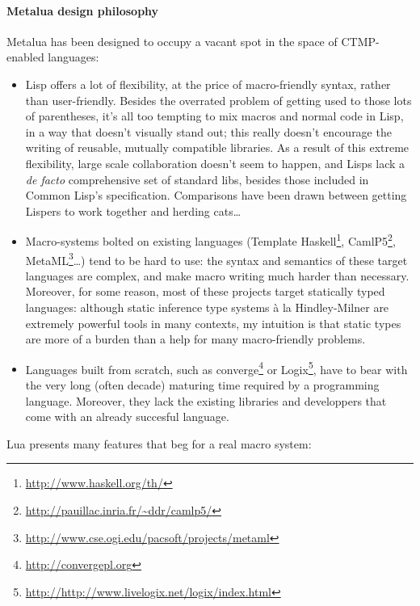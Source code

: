 \paragraph{Metalua design philosophy}
Metalua has been designed to occupy a vacant spot in the space of
CTMP-enabled languages:
\begin{itemize}

\item Lisp offers a lot of flexibility, at the price of macro-friendly
  syntax, rather than user-friendly. Besides the overrated problem of
  getting used to those lots of parentheses, it's all too tempting to
  mix macros and normal code in Lisp, in a way that doesn't visually
  stand out; this really doesn't encourage the writing of reusable,
  mutually compatible libraries. As a result of this extreme
  flexibility, large scale collaboration doesn't seem to happen, and
  Lisps lack a {\em de facto} comprehensive set of standard libs,
  besides those included in Common Lisp's specification. Comparisons
  have been drawn between getting Lispers to work together and herding
  cats\ldots

\item Macro-systems bolted on existing languages (Template
  Haskell\footnote{\url{http://www.haskell.org/th/}},
  CamlP5\footnote{\url{http://pauillac.inria.fr/~ddr/camlp5/}},
  MetaML\footnote{\url{http://www.cse.ogi.edu/pacsoft/projects/metaml}}\ldots)
  tend to be hard to use: the syntax and semantics of these target languages are
  complex, and make macro writing much harder than necessary. Moreover, for some
  reason, most of these projects target statically typed languages: although
  static inference type systems {\`a la} Hindley-Milner are extremely powerful
  tools in many contexts, my intuition is that static types are more of a burden
  than a help for many macro-friendly problems.

\item Languages built from scratch, such as
  converge\footnote{\url{http://convergepl.org}} or
  Logix\footnote{\url{http://http://www.livelogix.net/logix/index.html}}, have
  to bear with the very long (often decade) maturing time required by a
  programming language. Moreover, they lack the existing libraries and
  developpers that come with an already succesful language.

\end{itemize}

\noindent Lua presents many features that beg for a real macro system:

